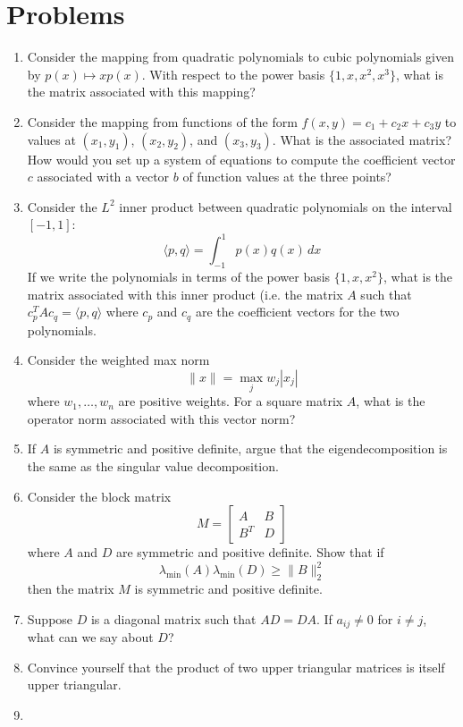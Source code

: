 \documentclass[12pt, leqno]{article}
\begin{document}
\section{Problems}

\begin{enumerate}
\item
  Consider the mapping from quadratic polynomials to cubic polynomials
  given by $p(x) \mapsto x p(x)$.  With respect to the power basis
  $\{1, x, x^2, x^3\}$, what is the matrix associated with this
  mapping?
\item
  Consider the mapping from functions of the form
  $f(x,y) = c_1 + c_2 x + c_3 y$
  to values at $(x_1,y_1)$, $(x_2,y_2)$, and $(x_3,y_3)$.
  What is the associated matrix?  How would you set up a system
  of equations to compute the coefficient vector $c$ associated
  with a vector $b$ of function values at the three points?
\item
  Consider the $L^2$ inner product between quadratic polynomials
  on the interval $[-1,1]$:
  \[
    \langle p, q \rangle = \int_{-1}^1 p(x) q(x) \, dx
  \]
  If we write the polynomials in terms of the power basis
  $\{1, x, x^2\}$, what is the matrix associated with this inner
  product (i.e. the matrix $A$ such that $c_p^T A c_q = \langle p, q
  \rangle$ where $c_p$ and $c_q$ are the coefficient vectors for
  the two polynomials.
\item
  Consider the weighted max norm
  \[
    \|x\| = \max_{j} w_j |x_j|
  \]
  where $w_1, \ldots, w_n$ are positive weights.  For a square matrix
  $A$, what is the operator norm associated with this vector norm?
\item
  If $A$ is symmetric and positive definite, argue that the
  eigendecomposition is the same as the singular value decomposition.
\item
  Consider the block matrix
  \[
    M = \begin{bmatrix} A & B \\ B^T & D \end{bmatrix}
  \]
  where $A$ and $D$ are symmetric and positive definite.  Show that if
  \[
    \lambda_{\min}(A) \lambda_{\min}(D) \geq \|B\|_2^2
  \]
  then the matrix $M$ is symmetric and positive definite.
\item
  Suppose $D$ is a diagonal matrix such that $AD = DA$.  If
  $a_{ij} \neq 0$ for $i \neq j$, what can we say about $D$?
\item
  Convince yourself that the product of two upper triangular
  matrices is itself upper triangular.
\item

\end{enumerate}
\end{document}
